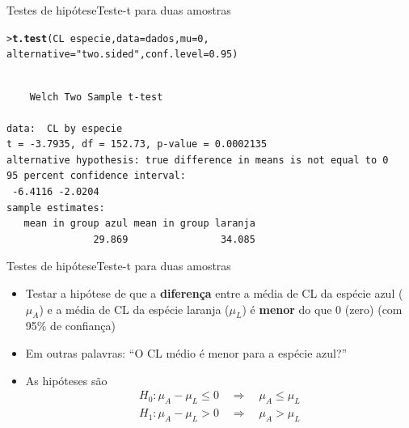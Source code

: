 \documentclass[10pt]{beamer}\usepackage{graphicx, color}
\makeatletter
\newcommand{\hlfunctioncall}[1]{\textcolor[rgb]{0,0,0.545098039215686}{\textbf{#1}}}%
\newcommand{\hlstring}[1]{\textcolor[rgb]{0.282352941176471,0.23921568627451,0.545098039215686}{#1}}%
\newenvironment{kframe}{%
 \def\at@end@of@kframe{}%
 \ifinner\ifhmode%
  \def\at@end@of@kframe{\end{minipage}}%
  \begin{minipage}{\columnwidth}%
 \fi\fi%
 \def\FrameCommand##1{\hskip\@totalleftmargin \hskip-\fboxsep
 \colorbox{shadecolor}{##1}\hskip-\fboxsep
     \hskip-\linewidth \hskip-\@totalleftmargin \hskip\columnwidth}%
 \MakeFramed {\advance\hsize-\width
   \@totalleftmargin\z@ \linewidth\hsize
   \@setminipage}}%
 {\par\unskip\endMakeFramed%
 \at@end@of@kframe}
\newenvironment{knitrout}{}{} %
\makeatother
\begin{document}
\begin{frame}[fragile=singleslide]{Testes de hipótese}{Teste-t para duas amostras}
\begin{knitrout}\small
{}\color{fgcolor}\begin{kframe}
\begin{alltt}
> \hlfunctioncall{t.test}(CL ~ especie, data = dados, mu = 0,
         alternative = \hlstring{"two.sided"}, conf.level = 0.95)
\end{alltt}
\begin{verbatim}

	Welch Two Sample t-test

data:  CL by especie 
t = -3.7935, df = 152.73, p-value = 0.0002135
alternative hypothesis: true difference in means is not equal to 0 
95 percent confidence interval:
 -6.4116 -2.0204 
sample estimates:
   mean in group azul mean in group laranja 
               29.869                34.085 

\end{verbatim}
\end{kframe}
\end{knitrout}

\end{frame}

\begin{frame}[fragile=singleslide]{Testes de hipótese}{Teste-t para duas amostras}
  \begin{itemize}
  \item Testar a hipótese de que a \textbf{diferença} entre a média de
    CL da espécie azul ($\mu_A$) e a média de CL da espécie laranja
    ($\mu_L$) é \textbf{menor} do que 0 (zero) (com 95\% de confiança)
  \item Em outras palavras: ``O CL médio é menor para a espécie azul?''
  \item As hipóteses são
    \begin{align*}
      H_0: \mu_A - \mu_L \leq 0 \quad \Rightarrow \quad \mu_A \leq \mu_L \\
      H_1: \mu_A - \mu_L > 0 \quad \Rightarrow \quad \mu_A > \mu_L
    \end{align*}
  \end{itemize}
\end{frame}
\end{document}
